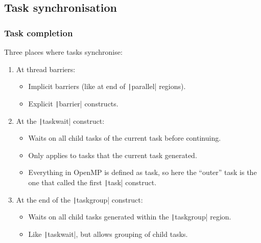 \documentclass{beamer}
\begin{document}
\subsection{Task synchronisation}
\begin{frame}
\frametitle{Task completion}
Three places where tasks synchronise:
\begin{enumerate}
  \item At thread barriers:
    \begin{itemize}
      \item Implicit barriers (like at end of \texttt|parallel| regions).
      \item Explicit \texttt|barrier| constructs.
    \end{itemize}
  \item At the \texttt|taskwait| construct:
    \begin{itemize}
      \item Waits on all child tasks of the current task before continuing.
      \item Only applies to tasks that the current task generated.
      \item Everything in OpenMP is defined as task, so here the ``outer'' task is the one that called the first \texttt|task| construct.
    \end{itemize}
  \item At the end of the \texttt|taskgroup| construct:
    \begin{itemize}
      \item Waits on all child tasks generated within the \texttt|taskgroup| region.
      \item Like \texttt|taskwait|, but allows grouping of child tasks.
    \end{itemize}
\end{enumerate}
\end{frame}
\end{document}
